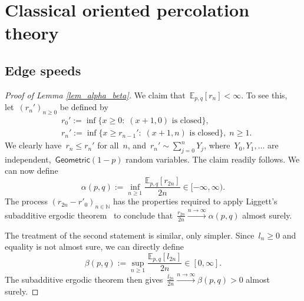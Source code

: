 \documentclass[pdflatex,sn-mathphys-num]{sn-jnl}%
\newcommand{\bbE}{{\ensuremath{\mathbb E}} }
\newcommand{\bbN}{{\ensuremath{\mathbb N}} }
\newcommand{\1}{{\ensuremath{\mathbf{1}}} }
\theoremstyle{thmstyleone}%
\theoremstyle{thmstyletwo}%
\theoremstyle{thmstylethree}%
\begin{document}
\section{Classical oriented percolation theory}
\label{app:classics}
\subsection{Edge speeds}
\label{app:edge}
\begin{proof}[Proof of Lemma \ref{lem_alpha_beta}]
	We claim that~$\bbE_{p,q}[r_n] < \infty$. To see this, let~$(r_n')_{n \ge 0}$ be defined by
	\begin{align*}&r_0':= \inf\{x \ge 0:\; (x+1,0) \text{ is closed}\}, \\
		&r_n':= \inf\{x \ge r_{n-1}':\; (x+1,n) \text{ is closed}\},\; n\ge 1.
	\end{align*}
	We clearly have~$r_n \le r_n'$ for all~$n$, and~$r_n' \sim \sum_{j=0}^n Y_j$, where~$Y_0, Y_1,\ldots$ are independent,~$\mathsf{Geometric}(1-p)$ random variables. The claim readily follows. We can now define
	\begin{equation}\label{eq_def_of_alpha}
	\alpha(p,q) := \inf_{n \ge 1} \frac{\mathbb E_{p,q}[r_{2n}]}{2n} \in [-\infty,\infty).
\end{equation}
The process $(r_{2n}-r'_0)_{n\in\bbN}$ has the properties required to apply Liggett's subadditive ergodic theorem~\cite[Theorem~VI.2.6]{Liggett05} to conclude that~$\frac{r_{2n}}{2n} \xrightarrow{n \to \infty} \alpha(p,q)$ almost surely.

The treatment of the second statement is similar, only simpler. Since~$l_n \ge 0$ {and equality is not almost sure}, we can directly define
\begin{equation*}
	\beta(p,q):= \sup_{n \ge 1} \frac{\mathbb E_{p,q}[l_{2n}]}{2n} \in [0,\infty].
\end{equation*}
The subadditive ergodic theorem then gives~$\frac{l_{2n}}{2n} \xrightarrow{n \to \infty} \beta(p,q){>0}$ almost surely.
\end{proof}
\end{document}
